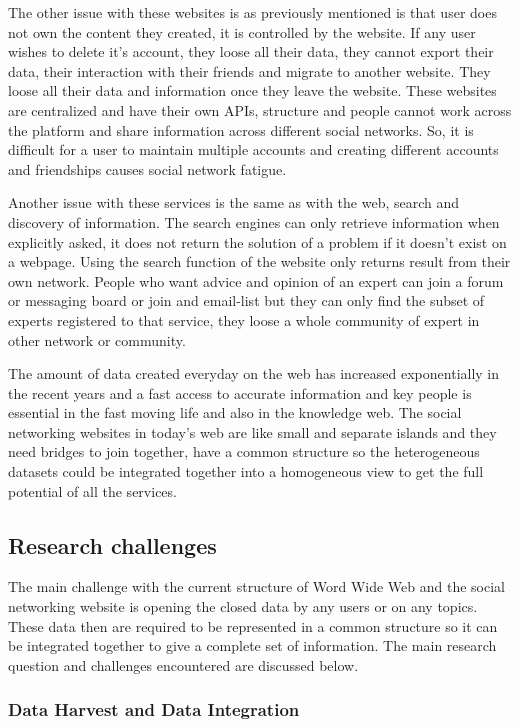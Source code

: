 The other issue with these websites is as previously mentioned is that user does not own the content they created, it is controlled by the website. If any user wishes to delete it's account, they loose all their data, they cannot export their data, their interaction with their friends and migrate to another website. They loose all their data and information once they leave the website. These websites are centralized and have their own APIs, structure and people cannot work across the platform and share information across different social networks. So, it is difficult for a user to maintain multiple accounts and creating different accounts and friendships causes social network fatigue.

Another issue with these services is the same as with the web, search and discovery of information. The search engines can only retrieve information when explicitly asked, it does not return the solution of a problem if it doesn't exist on a webpage. Using the search function of the website only returns result from their own network. People who want advice and opinion of an expert can join a forum or messaging board or join and email-list but they can only find the subset of experts registered to that service, they loose a whole community of expert in other network or community.

The amount of data created everyday on the web has increased exponentially in the recent years and a fast access to accurate information and key people is essential in the fast moving life and also in the knowledge web. The social networking websites in today's web are like small and separate islands and they need bridges to join together, have a common structure so the heterogeneous datasets could be integrated together into a homogeneous view to get the full potential of  all the services.


\subsection{Research challenges}

The main challenge with the current structure of Word Wide Web and the social networking website is opening the closed data by any users or on any topics.  These data then are required to be represented in a common structure so it can be integrated together to give a complete set of information. The main research question and challenges encountered are discussed below.

\subsubsection{Data Harvest and Data Integration}

